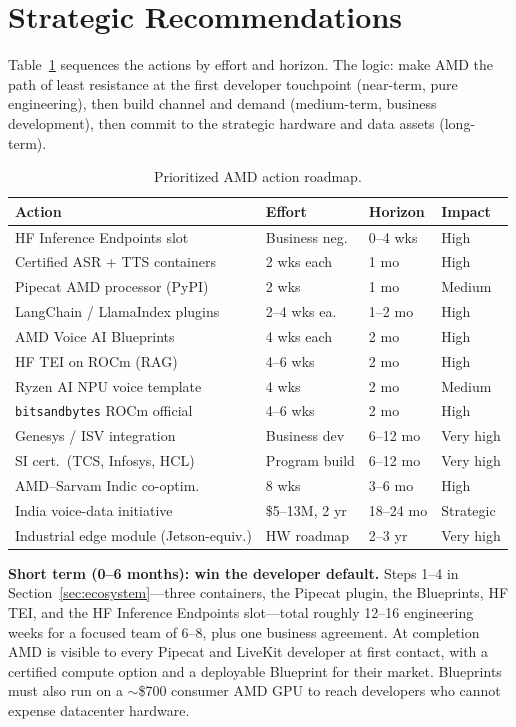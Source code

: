 \documentclass[blind]{gtac}
\begin{document}
\section{Strategic Recommendations}
\label{sec:reco}

Table~\ref{tab:roadmap} sequences the actions by effort and horizon. The logic: make AMD the path of least resistance at the first developer touchpoint (near-term, pure engineering), then build channel and demand (medium-term, business development), then commit to the strategic hardware and data assets (long-term).

\begin{table}[H]
\centering
\caption{Prioritized AMD action roadmap.}
\label{tab:roadmap}
\tiny
\begin{tabular}{@{}p{1.35in}p{0.6in}p{0.55in}p{0.5in}@{}}
\toprule
Action & Effort & Horizon & Impact \\
\midrule
HF Inference Endpoints slot & Business neg. & 0--4 wks & High \\
Certified ASR + TTS containers & 2 wks each & 1 mo & High \\
Pipecat AMD processor (PyPI) & 2 wks & 1 mo & Medium \\
LangChain / LlamaIndex plugins & 2--4 wks ea. & 1--2 mo & High \\
AMD Voice AI Blueprints & 4 wks each & 2 mo & High \\
HF TEI on ROCm (RAG) & 4--6 wks & 2 mo & High \\
Ryzen AI NPU voice template & 4 wks & 2 mo & Medium \\
\texttt{bitsandbytes} ROCm official & 4--6 wks & 2 mo & High \\
Genesys / ISV integration & Business dev & 6--12 mo & Very high \\
SI cert.\ (TCS, Infosys, HCL) & Program build & 6--12 mo & Very high \\
AMD--Sarvam Indic co-optim. & 8 wks & 3--6 mo & High \\
India voice-data initiative & \$5--13M, 2 yr & 18--24 mo & Strategic \\
Industrial edge module (Jetson-equiv.) & HW roadmap & 2--3 yr & Very high \\
\bottomrule
\end{tabular}
\end{table}

\textbf{Short term (0--6 months): win the developer default.} Steps 1--4 in Section~\ref{sec:ecosystem}---three containers, the Pipecat plugin, the Blueprints, HF TEI, and the HF Inference Endpoints slot---total roughly 12--16 engineering weeks for a focused team of 6--8, plus one business agreement. At completion AMD is visible to every Pipecat and LiveKit developer at first contact, with a certified compute option and a deployable Blueprint for their market. Blueprints must also run on a $\sim$\$700 consumer AMD GPU to reach developers who cannot expense datacenter hardware.
\end{document}
